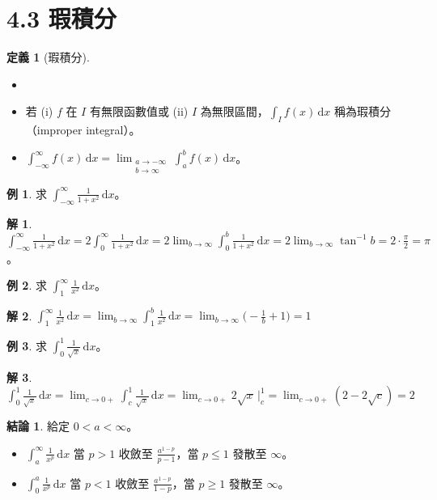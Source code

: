 \documentclass[12pt]{extarticle}
\newcommand{\ds}{\displaystyle}
\theoremstyle{definition}
\newtheorem*{dfn}{定義}
\newtheorem*{fact}{結論}
\newtheorem*{ex}{例}
\newtheorem*{sol}{解}
\begin{document}
\section*{4.3 瑕積分}

\begin{dfn}[瑕積分]
  \begin{itemize}\setlength\itemsep{0em}
    \item[]
    \item 若 (i) $f$ 在 $I$ 有無限函數值或 (ii) $I$ 為無限區間，$\ds\int_I f(x)\,\mathrm{d}x$ 稱為瑕積分（improper integral）。
    \item $\ds\int_{-\infty}^{\infty} f(x)\,\mathrm{d}x = \lim_{\substack{a\to-\infty \\ b\to\infty}}\int_a^b f(x)\,\mathrm{d}x$。
  \end{itemize}
\end{dfn}

\begin{ex}
  求 $\ds\int_{-\infty}^{\infty} \frac{1}{1 + x^2}\,\mathrm{d}x$。
\end{ex}

\begin{sol}
  $\ds\int_{-\infty}^{\infty} \frac{1}{1 + x^2}\,\mathrm{d}x = 2\int_0^\infty\frac{1}{1 + x^2}\,\mathrm{d}x = 2\lim_{b\to\infty}\int_0^b\frac{1}{1 + x^2}\,\mathrm{d}x = 2\lim_{b\to\infty}\tan^{-1} b = 2\cdot\frac{\pi}{2} = \pi$。
\end{sol}

\begin{ex}
  求 $\ds\int_{1}^{\infty} \frac{1}{x^2}\,\mathrm{d}x$。
\end{ex}

\begin{sol}
  $\ds\int_{1}^{\infty} \frac{1}{x^2}\,\mathrm{d}x = \lim_{b\to\infty}\int_1^b\frac{1}{x^2}\,\mathrm{d}x = \lim_{b\to\infty}\big(-\frac{1}{b} + 1\big) = 1$
\end{sol}

\begin{ex}
  求 $\ds\int_{0}^{1} \frac{1}{\sqrt{x}}\,\mathrm{d}x$。
\end{ex}

\begin{sol}
  $\ds\int_{0}^{1}\frac{1}{\sqrt{x}}\,\mathrm{d}x = \lim_{c\to0+}\int_c^1\frac{1}{\sqrt{x}}\,\mathrm{d}x = \lim_{c\to0+}2\sqrt{x}\,\Big|^1_c = \lim_{c\to0+}(2-2\sqrt{c}) = 2$
\end{sol}

\begin{fact} 給定 $\ds 0 < a < \infty$。
  \begin{itemize}\setlength\itemsep{0em}
    \item $\ds\int_{a}^{\infty}\frac{1}{x^p}\,\mathrm{d}x$ 當 $p > 1$ 收斂至 $\ds\frac{a^{1-p}}{p - 1}$，當 $\ds p\leqslant 1$ 發散至 $\infty$。
    \item $\ds\int_{0}^{a}\frac{1}{x^p}\,\mathrm{d}x$ 當 $p < 1$ 收斂至 $\ds\frac{a^{1-p}}{1 - p}$，當 $p\geqslant 1$ 發散至 $\infty$。
  \end{itemize}
\end{fact}
\end{document}
